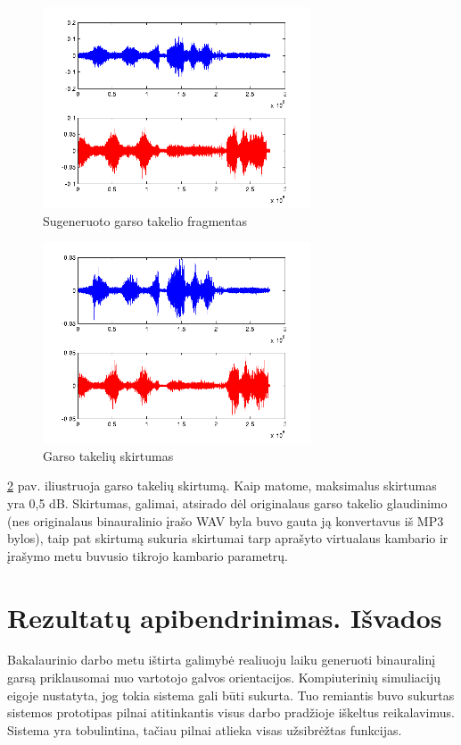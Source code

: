 \documentclass[]{vgtuef}
\begin{document}
{\begin{figure}[ht]
  \centering
  \includegraphics[width=300px]{img/garsas_generuotas.png}
  \caption{Sugeneruoto garso takelio fragmentas}
  \label{fig:garsas_gen}
\end{figure}

\begin{figure}[ht]
  \centering
  \includegraphics[width=300px]{img/garso_skirtumas.png}
  \caption{Garso takelių skirtumas}
  \label{fig:garsas_diff}
\end{figure}

\ref{fig:garsas_diff} pav. iliustruoja garso takelių skirtumą. Kaip matome, maksimalus skirtumas yra 0,5 dB. Skirtumas, galimai, atsirado dėl originalaus garso takelio glaudinimo (nes originalaus binauralinio įrašo WAV byla buvo gauta ją konvertavus iš MP3 bylos), taip pat skirtumą sukuria skirtumai tarp aprašyto virtualaus kambario ir įrašymo metu buvusio tikrojo kambario parametrų. 


\section{Rezultatų apibendrinimas. Išvados}

Bakalaurinio darbo metu ištirta galimybė realiuoju laiku generuoti binauralinį garsą priklausomai nuo vartotojo galvos orientacijos. Kompiuterinių simuliacijų eigoje nustatyta, jog tokia sistema gali būti sukurta. Tuo remiantis buvo sukurtas sistemos prototipas pilnai atitinkantis visus darbo pradžioje iškeltus reikalavimus. Sistema yra tobulintina, tačiau pilnai atlieka visas užsibrėžtas funkcijas.

}
\end{document}
